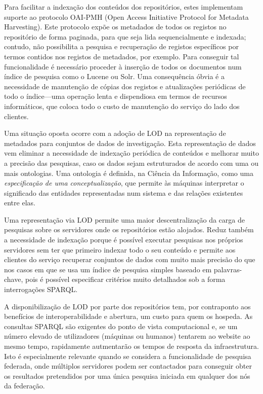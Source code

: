 \documentclass[sigconf,nonacm]{acmart}
\begin{document}
Para facilitar a indexação dos conteúdos dos repositórios, estes implementam suporte ao protocolo OAI-PMH (Open Access Initiative Protocol for Metadata Harvesting). Este protocolo expõe os metadados de todos os registos no repositório de forma paginada, para que seja lida sequencialmente e indexada; contudo, não possibilita a pesquisa e recuperação de registos específicos por termos contidos nos registos de metadados, por exemplo. Para conseguir tal funcionalidade é necessário proceder à inserção de todos os documentos num índice de pesquisa como o Lucene ou Solr. Uma consequência óbvia é a necessidade de manutenção de cópias dos registos e atualizações periódicas de todo o índice---uma operação lenta e dispendiosa em termos de recursos informáticos, que coloca todo o custo de manutenção do serviço do lado dos clientes.

Uma situação oposta ocorre com a adoção de \gls{LOD} na representação de metadados para conjuntos de dados de investigação. Esta representação de dados vem eliminar a necessidade de indexação periódica de conteúdos e melhorar muito a precisão das pesquisas, caso os dados sejam estruturados de acordo com uma ou mais ontologias. Uma ontologia é definida, na Ciência da Informação, como uma \textit{especificação de uma conceptualização}\cite{gruber1995toward}, que permite às máquinas interpretar o significado das entidades representadas num sistema e das relações existentes entre elas.

Uma representação via \gls{LOD} permite uma maior descentralização da carga de pesquisas sobre os servidores onde os repositórios estão alojados. Reduz também a necessidade de indexação porque é possível executar pesquisas nos próprios servidores sem ter que primeiro indexar todo o seu conteúdo e permite aos clientes do serviço recuperar conjuntos de dados com muito mais precisão do que nos casos em que se usa um índice de pesquisa simples baseado em palavras-chave, pois é possível especificar critérios muito detalhados sob a forma interrogações \gls{SPARQL}.

A disponibilização de \gls{LOD} por parte dos repositórios tem, por contraponto aos benefícios de interoperabilidade e abertura, um custo para quem os hospeda. As consultas \gls{SPARQL} são exigentes do ponto de vista computacional e, se um número elevado de utilizadores (máquinas ou humanos) tentarem ao website ao mesmo tempo, rapidamente autmentarão os tempos de resposta da infraestrutura. Isto é especialmente relevante quando se considera a funcionalidade de pesquisa federada, onde múltiplos servidores podem ser contactados para conseguir obter os resultados pretendidos por uma única pesquisa iniciada em qualquer dos nós da federação.
\end{document}
